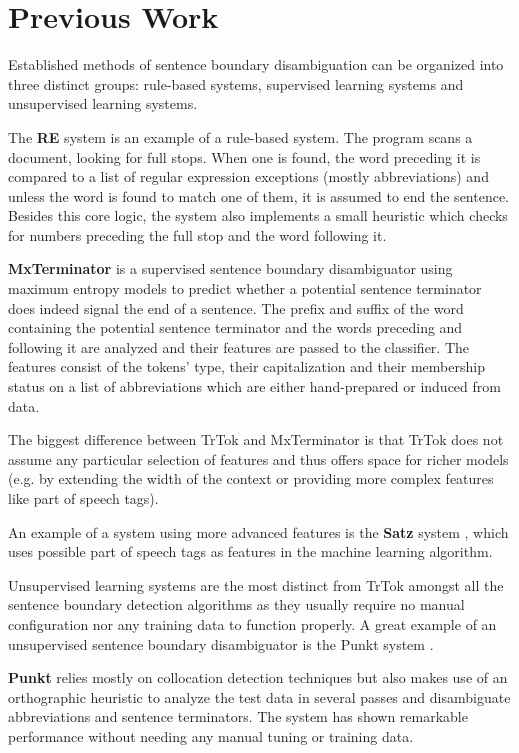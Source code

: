 \section{Previous Work}
\label{sec:previous-work}

Established methods of sentence boundary disambiguation can be
organized into three distinct groups: rule-based systems, supervised
learning systems and unsupervised learning systems.

The \textbf{RE} system \cite{sbd-re} is an example of a rule-based
system. The program scans a document, looking for full stops. When one
is found, the word preceding it is compared to a list of regular
expression exceptions (mostly abbreviations) and unless the word is
found to match one of them, it is assumed to end the sentence. Besides
this core logic, the system also implements a small heuristic which
checks for numbers preceding the full stop and the word following it.

\textbf{MxTerminator} \cite{sbd-mxterm} is a supervised sentence
boundary disambiguator using maximum entropy models to predict whether
a potential sentence terminator does indeed signal the end of a
sentence. The prefix and suffix of the word containing the potential
sentence terminator and the words preceding and following it are
analyzed and their features are passed to the classifier. The features
consist of the tokens' type, their capitalization and their membership
status on a list of abbreviations which are either hand-prepared or
induced from data.

The biggest difference between TrTok and MxTerminator is that TrTok
does not assume any particular selection of features and thus offers
space for richer models (e.g. by extending the width of the context or
providing more complex features like part of speech tags).

An example of a system using more advanced features is the
\textbf{Satz} system \cite{sbd-satz}, which uses possible part of
speech tags as features in the machine learning algorithm.

Unsupervised learning systems are the most distinct from TrTok amongst
all the sentence boundary detection algorithms as they usually require
no manual configuration nor any training data to function properly. A
great example of an unsupervised sentence boundary disambiguator is
the Punkt system \cite{sbd-punkt}.

\textbf{Punkt} relies mostly on collocation detection techniques but
also makes use of an orthographic heuristic to analyze the test data
in several passes and disambiguate abbreviations and sentence
terminators. The system has shown remarkable performance without
needing any manual tuning or training data.
